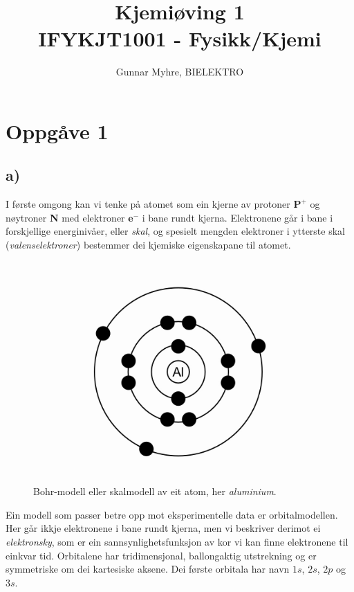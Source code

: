 \documentclass[12pt,a4paper]{article}
\title{%
  Kjemiøving 1 \\
  \large IFYKJT1001 - Fysikk/Kjemi \\
  }
\author{Gunnar Myhre, BIELEKTRO}
\begin{document}
  \maketitle

  \section*{Oppgåve 1}
    \subsection*{a)}
    I første omgong kan vi tenke på atomet som ein kjerne av protoner
    $\textbf{P}^+$ og nøytroner \textbf{N} med elektroner $\textbf{e}^-$ i bane
    rundt kjerna. Elektronene går i bane i forskjellige energinivåer, eller \textit{skal},
    og spesielt mengden elektroner i ytterste skal (\textit{valenselektroner}) bestemmer
    dei kjemiske eigenskapane til atomet.
    \begin{figure}[!h]
      \begin{center}
        \includegraphics[scale=.1]{kj_01_bohr_al}
        \caption{Bohr-modell eller skalmodell av eit atom, her \textit{aluminium}.}
      \end{center}
    \end{figure}

    Ein modell som passer betre opp mot eksperimentelle data er orbitalmodellen. Her 
    går ikkje elektronene i bane rundt kjerna, men vi beskriver derimot ei
    \textit{elektronsky}, som er ein sannsynlighetsfunksjon av kor vi kan finne
    elektronene til einkvar tid. Orbitalene har tridimensjonal, ballongaktig utstrekning
    og er symmetriske om dei kartesiske aksene. Dei første orbitala har navn $1s$, $2s$,
    $2p$ og $3s$.
    
\end{document}
